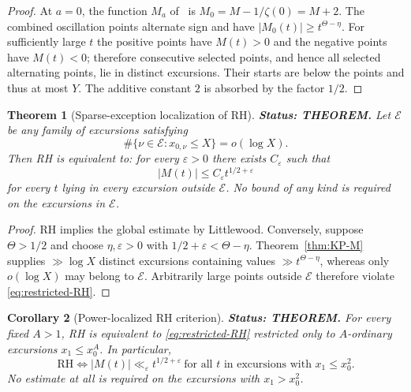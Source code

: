 \documentclass[11pt]{amsart}
\numberwithin{equation}{section}
\theoremstyle{plain}
\newtheorem{theorem}{Theorem}[section]
\newtheorem{corollary}[theorem]{Corollary}
\theoremstyle{definition}
\theoremstyle{remark}
\begin{document}
\begin{proof}
At $a=0$, the function $M_a$ of~\cite{KP86} is
$M_0=M-1/\zeta(0)=M+2$. The combined oscillation points alternate sign and
have $|M_0(t)|\ge t^{\Theta-\eta}$. For sufficiently large $t$ the positive
points have $M(t)>0$ and the negative points have $M(t)<0$; therefore
consecutive selected points, and hence all selected alternating points, lie
in distinct excursions. Their starts are below the points and thus at most
$Y$. The additive constant $2$ is absorbed by the factor $1/2$.
\end{proof}

\begin{theorem}[Sparse-exception localization of RH]
\label{thm:sparse-RH}
\textbf{Status: THEOREM.} Let $\mathcal E$ be any family of excursions satisfying
\[
\#\{\nu\in\mathcal E:x_{0,\nu}\le X\}=o(\log X).
\]
Then RH is equivalent to: for every $\varepsilon>0$ there exists
$C_\varepsilon$ such that
\begin{equation}
\label{eq:restricted-RH}
|M(t)|\le C_\varepsilon t^{1/2+\varepsilon}
\end{equation}
for every $t$ lying in every excursion outside $\mathcal E$. No bound of any
kind is required on the excursions in $\mathcal E$.
\end{theorem}

\begin{proof}
RH implies the global estimate by Littlewood. Conversely, suppose
$\Theta>1/2$ and choose $\eta,\varepsilon>0$ with
$1/2+\varepsilon<\Theta-\eta$. Theorem~\ref{thm:KP-M} supplies
$\gg\log X$ distinct excursions containing values
$\gg t^{\Theta-\eta}$, whereas only $o(\log X)$ may belong to $\mathcal E$.
Arbitrarily large points outside $\mathcal E$ therefore violate
\eqref{eq:restricted-RH}.
\end{proof}

\begin{corollary}[Power-localized RH criterion]
\label{cor:power-ordinary-RH}
\textbf{Status: THEOREM.} For every fixed $A>1$, RH is equivalent to \eqref{eq:restricted-RH}
restricted only to $A$-ordinary excursions $x_1\le x_0^A$. In particular,
\begin{equation}
\boxed{\mathrm{RH}\iff
|M(t)|\ll_\varepsilon t^{1/2+\varepsilon}
\ \text{for all $t$ in excursions with }x_1\le x_0^2.}
\label{eq:square-horizon-RH}
\end{equation}
No estimate at all is required on the excursions with $x_1>x_0^2$.
\end{corollary}
\end{document}
